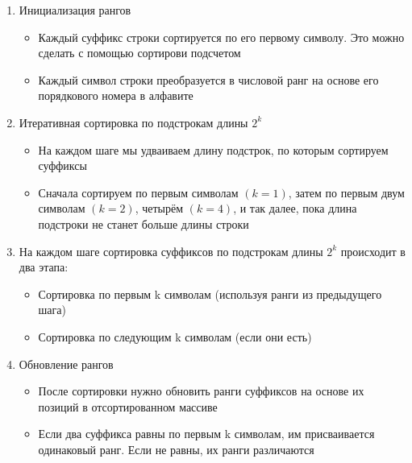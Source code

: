 \documentclass[a4paper]{article}
\begin{document}


\begin{enumerate}
    \item Инициализация рангов
    \begin{itemize}
        \item Каждый суффикс строки сортируется по его первому символу. Это можно сделать с помощью сортирови подсчетом
        \item Каждый символ строки преобразуется в числовой ранг на основе его порядкового номера в алфавите
    \end{itemize}
    \item Итеративная сортировка по подстрокам длины $2^k$
    \begin{itemize}
        \item На каждом шаге мы удваиваем длину подстрок, по которым сортируем суффиксы
        \item Сначала сортируем по первым символам $(k = 1)$, затем по первым двум символам $(k = 2)$, четырём $(k = 4)$, и так далее, пока длина подстроки не станет больше длины строки
    \end{itemize}
    \item На каждом шаге сортировка суффиксов по подстрокам длины $2^k$ происходит в два этапа:
    \begin{itemize}
            \item Сортировка по первым k символам (используя ранги из предыдущего шага)
            \item Сортировка по следующим k символам (если они есть)
    \end{itemize}
    \item Обновление рангов
    \begin{itemize}
        \item После сортировки нужно обновить ранги суффиксов на основе их позиций в отсортированном массиве
        \item Если два суффикса равны по первым k символам, им присваивается одинаковый ранг. Если не равны, их ранги различаются
    \end{itemize}
\end{enumerate}
\end{document}
